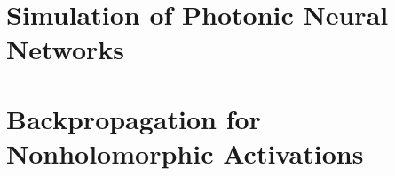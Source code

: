 \documentclass{report}
\begin{document}

\appendix

\chapter{Simulation of Photonic Neural Networks}


\chapter{Backpropagation for Nonholomorphic Activations}





\end{document}
